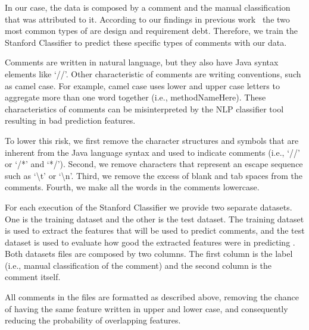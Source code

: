 In our case, the data is composed by a comment and the manual classification that was attributed to it. According to our findings in previous work~\cite{Maldonado2015MTD} the two most common types of \SATD are design and requirement debt. Therefore, we train the Stanford Classifier to predict these specific types of \SATD comments with our data.

Comments are written in natural language, but they also have Java syntax elements like `//'. Other characteristic of comments are writing conventions, such as camel case. For example, camel case uses lower and upper case letters to aggregate more than one word together (i.e., methodNameHere). These characteristics of comments can be misinterpreted by the NLP classifier tool resulting in bad prediction features. 

To lower this risk, we first remove the character structures and symbols that are inherent from the Java language syntax and used to indicate comments (i.e., `//' or `/*' and `*/'). Second, we remove characters that represent an escape sequence such as `\textbackslash t' or `\textbackslash n'. Third, we remove the excess of blank and tab spaces from the comments. Fourth, we make all the words in the comments lowercase.

For each execution of the Stanford Classifier we provide two separate datasets. One is the training dataset and the other is the test dataset. The training dataset is used to extract the features that will be used to predict \SATD comments, and the test dataset is used to evaluate how good the extracted features were in predicting \SATD. Both datasets files are composed by two columns. The first column is the label (i.e., manual classification of the comment) and the second column is the comment itself.

All comments in the files are formatted as described above, removing the chance of having the same feature written in upper and lower case, and consequently reducing the probability of overlapping features. 

